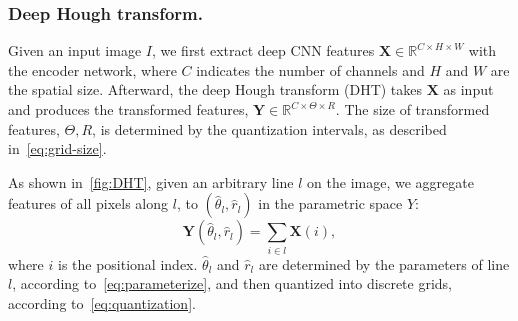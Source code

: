 \documentclass[10pt,journal,cspaper,compsoc]{IEEEtran}
\newcommand{\CheckRmv}[1]{}
\newcommand{\CheckRmv}[1]{#1}
\begin{document}
\CheckRmv{
\begin{figure*}[tb]
  \centering
  \hfill
  \subfigure[]{
    \label{fig:DHT}
    \begin{overpic}[height=.18\linewidth]{figures/dht.pdf}
      \put(-5, 19){$H$}
      \put(15, 33.3){$W$}
      \put(55, 19){$\Theta$}
      \put(75, 33.3){$R$}
      \put(20, 43){$\mathbf{X}$}
      \put(79, 43){$\mathbf{Y}$}
      \put(76, 8){$(\hat{\theta}_l, \hat{r}_l)$}
    \end{overpic}
  }\hfill
  \subfigure[]{
    \label{fig:nonlocal}
    \begin{overpic}[width=0.46\linewidth]{figures/nonlocal.pdf}
      \put(19, 39){$W$}
      \put(-6, 20){$H$}
      \put(80, 39){$\Theta$}
      \put(102, 20){$R$}
      \put(45, 24){DHT}
      \put(45, 11){RHT}
      \put(6, -4){feature space}
      \put(65, -4){parametric space}
    \end{overpic}
  }\hfill
  \caption{
    (a): Features along a line in the feature space (blue, left) are
    accumulated to a point $(\hat{r}_l,\hat{\theta}_l)$ in the parametric space (red, right).
    (b): Illustration of the proposed context-aware feature aggregation.
    Features of nearby lines in the feature space (left)
    are translated into neighbor points in the parametric space (right).
    In the parametric space, a simple $3\times 3$ convolutional operation can
    easily capture contextual information for the central line (orange).
    Best viewed in color.
  }
\end{figure*}
}

\subsubsection{Deep Hough transform.}
Given an input image $I$,  we first extract deep CNN features 
$\mathbf{X} \in \mathbb{R} ^ {C \times H \times W}$ with the encoder network,
where $C$ indicates the number of channels and $H$ and $W$ are the spatial size.
%
Afterward, the deep Hough transform (DHT) takes $\mathbf{X}$ as input and produces
the transformed features, $\mathbf{Y} \in \mathbb{R} ^ {C \times \Theta \times R}$.
%
The size of transformed features, $\Theta, R$, is determined by the quantization intervals, as
described in~\cref{eq:grid-size}.

As shown in~\cref{fig:DHT},
given an arbitrary line $l$ on the image,
we aggregate features of all pixels along $l$,
to $(\hat{\theta}_l, \hat{r}_l)$ in the parametric space $Y$:
\begin{equation}
  \mathbf{Y}(\hat{\theta}_l, \hat{r}_l) = \sum_{i\in l} \mathbf{X}(i),
  \label{eq:dht}
\end{equation}
where $i$ is the positional index.
%
$\hat{\theta}_l$ and $\hat{r}_l$ are determined by the parameters of line $l$, according
to~\cref{eq:parameterize}, and then quantized into discrete grids, according to~\cref{eq:quantization}.
\end{document}
